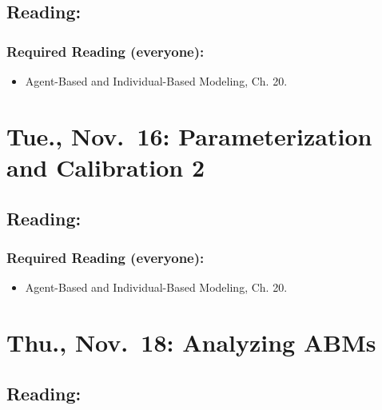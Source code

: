 \documentclass[
]{article}
\providecommand{\tightlist}{%
  \setlength{\itemsep}{0pt}\setlength{\parskip}{0pt}}
\begin{document}
\hypertarget{reading-21}{%
\subsection{Reading:}\label{reading-21}}

\hypertarget{required-reading-everyone-18}{%
\subsubsection{Required Reading
(everyone):}\label{required-reading-everyone-18}}

\begin{itemize}
\tightlist
\item
  Agent-Based and Individual-Based Modeling, Ch. 20.
\end{itemize}

\hypertarget{tue.-nov.-16-parameterization-and-calibration-2}{%
\section{Tue., Nov.~16: Parameterization and Calibration
2}\label{tue.-nov.-16-parameterization-and-calibration-2}}

\hypertarget{reading-22}{%
\subsection{Reading:}\label{reading-22}}

\hypertarget{required-reading-everyone-19}{%
\subsubsection{Required Reading
(everyone):}\label{required-reading-everyone-19}}

\begin{itemize}
\tightlist
\item
  Agent-Based and Individual-Based Modeling, Ch. 20.
\end{itemize}

\hypertarget{thu.-nov.-18-analyzing-abms}{%
\section{Thu., Nov.~18: Analyzing
ABMs}\label{thu.-nov.-18-analyzing-abms}}

\hypertarget{reading-23}{%
\subsection{Reading:}\label{reading-23}}
\end{document}
